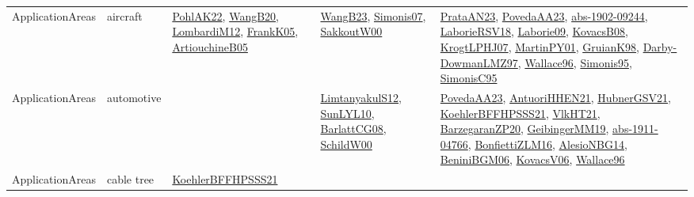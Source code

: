 {\begin{longtable}{lp{3cm}>{\raggedright}p{6cm}>{\raggedright}p{6cm}p{8cm}}
ApplicationAreas & aircraft & \href{articles/PohlAK22.pdf}{PohlAK22}\cite{PohlAK22}, \href{papers/WangB20.pdf}{WangB20}\cite{WangB20}, \href{articles/LombardiM12.pdf}{LombardiM12}\cite{LombardiM12}, \href{papers/FrankK05.pdf}{FrankK05}\cite{FrankK05}, \href{papers/ArtiouchineB05.pdf}{ArtiouchineB05}\cite{ArtiouchineB05} & \href{papers/WangB23.pdf}{WangB23}\cite{WangB23}, \href{articles/Simonis07.pdf}{Simonis07}\cite{Simonis07}, \href{articles/SakkoutW00.pdf}{SakkoutW00}\cite{SakkoutW00} & \href{articles/PrataAN23.pdf}{PrataAN23}\cite{PrataAN23}, \href{papers/PovedaAA23.pdf}{PovedaAA23}\cite{PovedaAA23}, \href{articles/abs-1902-09244.pdf}{abs-1902-09244}\cite{abs-1902-09244}, \href{articles/LaborieRSV18.pdf}{LaborieRSV18}\cite{LaborieRSV18}, \href{papers/Laborie09.pdf}{Laborie09}\cite{Laborie09}, \href{articles/KovacsB08.pdf}{KovacsB08}\cite{KovacsB08}, \href{papers/KrogtLPHJ07.pdf}{KrogtLPHJ07}\cite{KrogtLPHJ07}, \href{articles/MartinPY01.pdf}{MartinPY01}\cite{MartinPY01}, \href{papers/GruianK98.pdf}{GruianK98}\cite{GruianK98}, \href{articles/Darby-DowmanLMZ97.pdf}{Darby-DowmanLMZ97}\cite{Darby-DowmanLMZ97}, \href{articles/Wallace96.pdf}{Wallace96}\cite{Wallace96}, \href{papers/Simonis95.pdf}{Simonis95}\cite{Simonis95}, \href{papers/SimonisC95.pdf}{SimonisC95}\cite{SimonisC95}\\
ApplicationAreas & automotive &  & \href{articles/LimtanyakulS12.pdf}{LimtanyakulS12}\cite{LimtanyakulS12}, \href{papers/SunLYL10.pdf}{SunLYL10}\cite{SunLYL10}, \href{papers/BarlattCG08.pdf}{BarlattCG08}\cite{BarlattCG08}, \href{articles/SchildW00.pdf}{SchildW00}\cite{SchildW00} & \href{papers/PovedaAA23.pdf}{PovedaAA23}\cite{PovedaAA23}, \href{papers/AntuoriHHEN21.pdf}{AntuoriHHEN21}\cite{AntuoriHHEN21}, \href{articles/HubnerGSV21.pdf}{HubnerGSV21}\cite{HubnerGSV21}, \href{articles/KoehlerBFFHPSSS21.pdf}{KoehlerBFFHPSSS21}\cite{KoehlerBFFHPSSS21}, \href{articles/VlkHT21.pdf}{VlkHT21}\cite{VlkHT21}, \href{papers/BarzegaranZP20.pdf}{BarzegaranZP20}\cite{BarzegaranZP20}, \href{papers/GeibingerMM19.pdf}{GeibingerMM19}\cite{GeibingerMM19}, \href{articles/abs-1911-04766.pdf}{abs-1911-04766}\cite{abs-1911-04766}, \href{papers/BonfiettiZLM16.pdf}{BonfiettiZLM16}\cite{BonfiettiZLM16}, \href{papers/AlesioNBG14.pdf}{AlesioNBG14}\cite{AlesioNBG14}, \href{papers/BeniniBGM06.pdf}{BeniniBGM06}\cite{BeniniBGM06}, \href{papers/KovacsV06.pdf}{KovacsV06}\cite{KovacsV06}, \href{articles/Wallace96.pdf}{Wallace96}\cite{Wallace96}\\
ApplicationAreas & cable tree & \href{articles/KoehlerBFFHPSSS21.pdf}{KoehlerBFFHPSSS21}\cite{KoehlerBFFHPSSS21} &  & \\

\end{longtable}}
